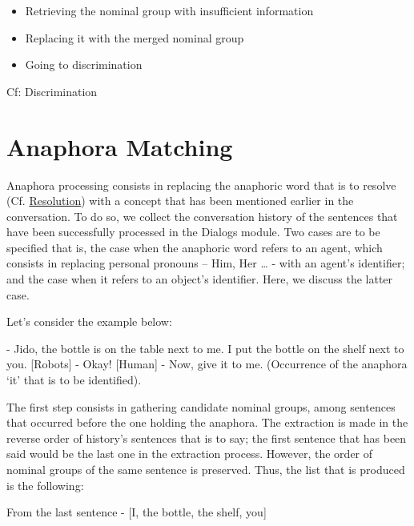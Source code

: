 \documentclass[twoside,a4paper,10pt]{report}
\begin{document}
\begin{itemize}
    \item  Retrieving the nominal group with insufficient information
    \item  Replacing it with the merged nominal group
    \item  Going to discrimination
\end{itemize}

Cf: Discrimination


\section{Anaphora Matching}
\label{4873f0687cc3361050cff094f296df2d}%

Anaphora processing consists in replacing the anaphoric word that is to resolve (Cf. \hyperref[b7e164b34ff76b1cda93a058604190da]{Resolution}) with a concept that has been mentioned earlier in the conversation. To do so, we collect the conversation history of the sentences that have been successfully processed in the Dialogs module.
Two cases are to be specified that is, the case when the anaphoric word refers to an agent, which consists in replacing personal pronouns – Him, Her … - with an agent’s identifier; and the case when it  refers to an object’s identifier. Here, we discuss the latter case.

Let’s consider the example below:


\small
\begin{verbatimtab}
  [Human]  - Jido, the bottle is on the table next to me. I put the bottle on the shelf next to you.
  [Robots] - Okay!
  [Human]  - Now, give it to me. (Occurrence of the anaphora ‘it’ that is to be identified).
\end{verbatimtab}
\normalsize

The first step consists in gathering candidate nominal groups, among sentences that occurred before the one holding the anaphora. The extraction is made in the reverse order of history’s sentences that is to say; the first sentence that has been said would be the last one in the extraction process. However, the order of nominal groups of the same sentence is preserved. Thus, the list that is produced is the following:



\small
\begin{verbatimtab}
   From the last sentence - [I, the bottle, the shelf, you] 
\end{verbatimtab}
\normalsize
\end{document}

